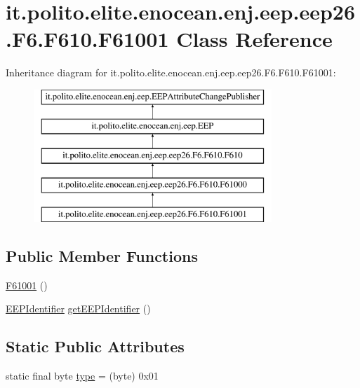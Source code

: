 \hypertarget{classit_1_1polito_1_1elite_1_1enocean_1_1enj_1_1eep_1_1eep26_1_1_f6_1_1_f610_1_1_f61001}{}\section{it.\+polito.\+elite.\+enocean.\+enj.\+eep.\+eep26.\+F6.\+F610.\+F61001 Class Reference}
\label{classit_1_1polito_1_1elite_1_1enocean_1_1enj_1_1eep_1_1eep26_1_1_f6_1_1_f610_1_1_f61001}
Inheritance diagram for it.\+polito.\+elite.\+enocean.\+enj.\+eep.\+eep26.\+F6.\+F610.\+F61001\+:\begin{figure}[H]
\begin{center}
\leavevmode
\includegraphics[height=5.000000cm]{classit_1_1polito_1_1elite_1_1enocean_1_1enj_1_1eep_1_1eep26_1_1_f6_1_1_f610_1_1_f61001}
\end{center}
\end{figure}
\subsection*{Public Member Functions}
\begin{DoxyCompactItemize}
\item 
\hyperlink{classit_1_1polito_1_1elite_1_1enocean_1_1enj_1_1eep_1_1eep26_1_1_f6_1_1_f610_1_1_f61001_aae3d5cbd22bc5abf43a42bb10436e71b}{F61001} ()
\item 
\hyperlink{classit_1_1polito_1_1elite_1_1enocean_1_1enj_1_1eep_1_1_e_e_p_identifier}{E\+E\+P\+Identifier} \hyperlink{classit_1_1polito_1_1elite_1_1enocean_1_1enj_1_1eep_1_1eep26_1_1_f6_1_1_f610_1_1_f61001_a29d0bbbf483c15224d15ceabd099147e}{get\+E\+E\+P\+Identifier} ()
\end{DoxyCompactItemize}
\subsection*{Static Public Attributes}
\begin{DoxyCompactItemize}
\item 
static final byte \hyperlink{classit_1_1polito_1_1elite_1_1enocean_1_1enj_1_1eep_1_1eep26_1_1_f6_1_1_f610_1_1_f61001_a686751620d1344ac1d01eedaf914887c}{type} = (byte) 0x01
\end{DoxyCompactItemize}
